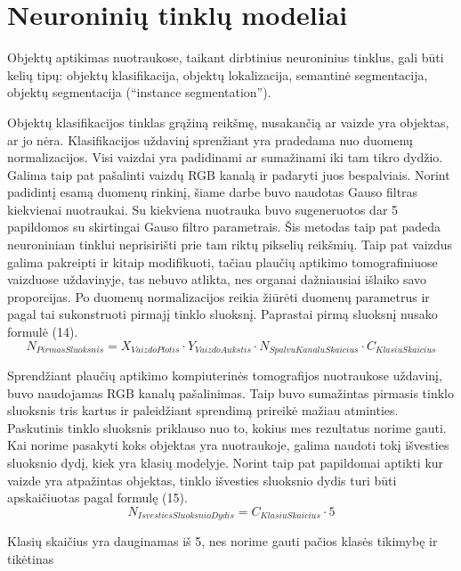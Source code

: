 \documentclass{VUMIFInfKursinis}
\begin{document}
\section{Neuroninių tinklų modeliai}
\par
Objektų aptikimas nuotraukose, taikant dirbtinius neuroninius tinklus, gali būti kelių
tipų: objektų klasifikacija, objektų lokalizacija, semantinė segmentacija,
objektų segmentacija (\enquote{instance segmentation}).
 \par
 Objektų klasifikacijos tinklas grąžiną reikšmę, nusakančią ar vaizde yra objektas,
 ar jo nėra. Klasifikacijos uždavinį sprenžiant yra pradedama nuo duomenų normalizacijos.
 Visi vaizdai yra padidinami ar sumažinami iki tam tikro dydžio. Galima taip pat pašalinti
 vaizdų RGB kanalą ir padaryti juos bespalviais. Norint padidintį esamą duomenų rinkinį, šiame
 darbe buvo naudotas Gauso filtras kiekvienai nuotraukai. Su kiekviena nuotrauka buvo sugeneruotos dar
 5 papildomos su skirtingai Gauso filtro parametrais. Šis metodas taip pat padeda neuroniniam
 tinklui neprisirišti prie tam riktų pikselių reikšmių. Taip pat vaizdus galima pakreipti ir kitaip
 modifikuoti, tačiau plaučių aptikimo tomografiniuose vaizduose uždavinyje, tas nebuvo
 atlikta, nes organai dažniausiai išlaiko savo proporcijas. Po duomenų normalizacijos reikia
 žiūrėti duomenų parametrus ir pagal tai sukonstruoti pirmajį tinklo sluoksnį. Paprastai pirmą sluoksnį
 nusako formulė (14).
\begin{equation}
N_{PirmasSluoksnis} = X_{VaizdoPlotis} \cdot Y_{VaizdoAukstis} \cdot N_{SpalvuKanaluSkaicius} \cdot C_{KlasiuSkaicius}
\end{equation}
 \par
Sprendžiant plaučių aptikimo kompiuterinės tomografijos nuotraukose uždavinį, buvo naudojamas
RGB kanalų pašalinimas. Taip buvo sumažintas pirmasis tinklo sluoksnis tris kartus ir paleidžiant
sprendimą prireikė mažiau atminties. Paskutinis tinklo sluoksnis priklauso nuo to, kokius mes
rezultatus norime gauti. Kai norime pasakyti koks objektas yra nuotraukoje, galima naudoti
tokį išvesties sluoksnio dydį, kiek yra klasių modelyje. Norint taip pat papildomai aptikti kur
vaizde yra atpažintas objektas, tinklo išvesties sluoksnio dydis turi būti apskaičiuotas pagal formulę (15).
\begin{equation}
  N_{IsvestiesSluoksnioDydis} = C_{KlasiuSkaicius} \cdot 5
\end{equation}
\par
Klasių skaičius yra dauginamas iš 5, nes norime gauti pačios klasės tikimybę ir tikėtinas
\end{document}
